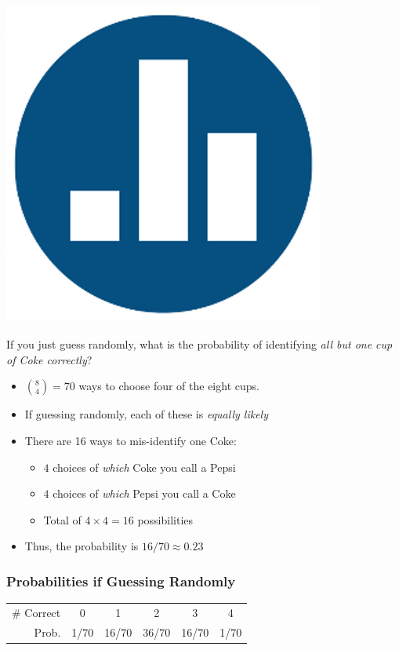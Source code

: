 \begin{frame}
\frametitle{\includegraphics[scale = 0.05]{./images/clicker}}
If you just guess randomly, what is the probability of identifying \emph{all but one cup of Coke correctly}?
\pause
\begin{itemize}
\item ${8\choose 4}=70$ ways to choose four of the eight cups. \pause
\item If guessing randomly, each of these is \emph{\alert{equally likely}} \pause
\item There are 16 ways to mis-identify one Coke: 
	\begin{itemize}
		\item $4$ choices of \emph{which} Coke you call a Pepsi 
		\item $4$ choices of \emph{which} Pepsi you call a Coke 
		\item Total of $4\times 4 = 16$ possibilities \pause
	\end{itemize}	
\item Thus, the probability is $16/70 \approx 0.23$
\end{itemize}
\end{frame}
\begin{frame}
\frametitle{Probabilities if Guessing Randomly}
	\begin{center}
		\begin{tabular}{rccccc}
		\hline
		\# Correct & 0 & 1 & 2 & 3 & 4\\
		Prob.&1/70 & 16/70 & 36/70 & 16/70 &1/70\\
		\hline
		\end{tabular}
	\end{center}
\end{frame}

